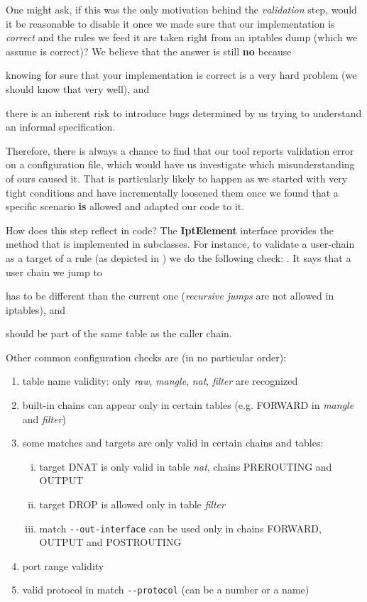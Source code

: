 One might ask, if this was the only motivation behind the \emph{validation}
step, would it be reasonable to disable it once we made sure that our
implementation is \emph{correct} and the rules we feed it are taken right from
an iptables dump (which we assume is correct)?  We believe that the answer is
still \textbf{no} because
\begin{enumerate*}[(i)]
  \item knowing for sure that your implementation is correct is a very hard
    problem (we should know that very well), and
  \item there is an inherent risk to introduce bugs determined by us trying to
    understand an informal specification.
\end{enumerate*}
Therefore, there is always a chance to find that our tool reports validation
error on a configuration file, which would have us investigate which
misunderstanding of ours caused it.  That is particularly likely to happen as
we started with very tight conditions and have incrementally loosened them once
we found that a specific scenario \textbf{is} allowed and adapted our code to
it.

How does this step reflect in code?  The \textbf{IptElement} interface provides
the method  that is
implemented in subclasses.  For instance, to validate a user-chain as a target
of a rule (as depicted in ) we do the
following check: .  It
says that a user chain we jump to
\begin{enumerate*}[(i)]
  \item has to be different than the current one (\emph{recursive jumps} are
    not allowed in iptables), and
  \item should be part of the same table as the caller chain.
\end{enumerate*}

Other common configuration checks are (in no particular order):
\begin{enumerate}
  \item table name validity: only \emph{raw}, \emph{mangle}, \emph{nat},
    \emph{filter} are recognized
  \item built-in chains can appear only in certain tables (e.g. FORWARD in
    \emph{mangle} and \emph{filter})
  \item some matches and targets are only valid in certain chains and tables:
    \begin{enumerate}[(i)]
      \item target DNAT is only valid in table \emph{nat}, chains PREROUTING
        and OUTPUT
      \item target DROP is allowed only in table \emph{filter}
      \item match \lstinline{--out-interface} can be used only in chains
        FORWARD, OUTPUT and POSTROUTING
    \end{enumerate}
  \item port range validity
  \item valid protocol in match \lstinline{--protocol} (can be a number or a
    name)
\end{enumerate}

